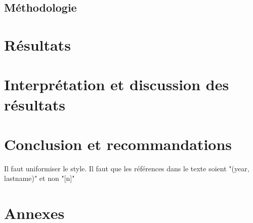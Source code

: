 \documentclass[12pt, letterpaper]{article}
\begin{document}
\subsection{Méthodologie}

\section{Résultats}

\section{Interprétation et discussion des résultats}

\section{Conclusion et recommandations}

\clearpage 
\newpage
{
   \color{red}
   \par Il faut uniformiser le style. Il faut que les références dans le texte soient "(year, lastname)" et non "[n]"
}
\printbibliography[title={\bibname\label{bib:references}}] 
\clearpage 
\newpage
\section{Annexes}

\end{document}

